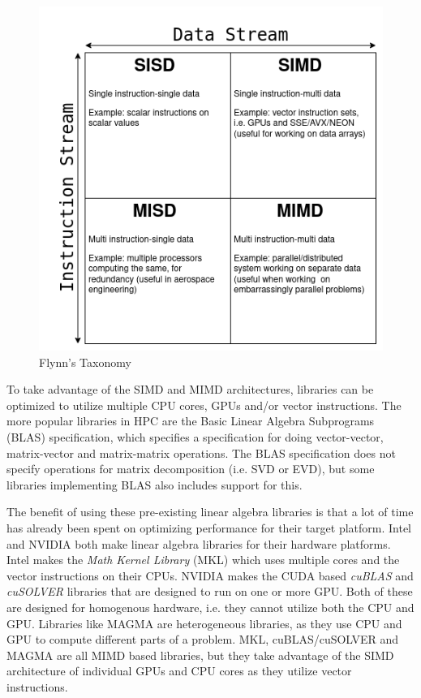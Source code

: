 \begin{figure}[H]
    \centering
    \includegraphics[scale=0.45]{Figures/flynns_taxonomy.png}
    \caption{Flynn's Taxonomy}
    \label{fig:flynn:taxonomy}
\end{figure}

To take advantage of the SIMD and MIMD architectures, libraries can be optimized to utilize multiple CPU cores, GPUs and/or vector instructions. The more popular libraries in HPC are the Basic Linear Algebra Subprograms (BLAS) specification, which specifies a specification for doing vector-vector, matrix-vector and matrix-matrix operations. The BLAS specification does not specify operations for matrix decomposition (i.e. SVD or EVD), but some libraries implementing BLAS also includes support for this.

The benefit of using these pre-existing linear algebra libraries is that a lot of time has already been spent on optimizing performance for their target platform. Intel and NVIDIA both make linear algebra libraries for their hardware platforms. Intel makes the \textit{Math Kernel Library} (MKL) which uses multiple cores and the vector instructions on their CPUs. NVIDIA makes the CUDA based \textit{cuBLAS} and \textit{cuSOLVER} libraries that are designed to run on one or more GPU. Both of these are designed for homogenous hardware, i.e. they cannot utilize both the CPU and GPU. Libraries like MAGMA are heterogeneous libraries, as they use CPU and GPU to compute different parts of a problem. MKL, cuBLAS/cuSOLVER and MAGMA are all MIMD based libraries, but they take advantage of the SIMD architecture of individual GPUs and CPU cores as they utilize vector instructions.

